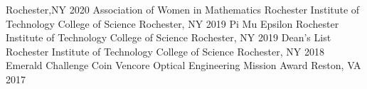 \begin{cvhonors}
 {Rochester,NY} {2020} 
  \cvhonor
    {Association of Women in Mathematics}
    {Rochester Institute of Technology College of Science}
    {Rochester, NY}
    {2019} 
  \cvhonor
    {Pi Mu Epsilon}
    {Rochester Institute of Technology College of Science}
    {Rochester, NY}
    {2019} 
  \cvhonor
    {Dean's List}
    {Rochester Institute of Technology College of Science}
    {Rochester, NY}
    {2018}  
   \cvhonor
    {Emerald Challenge Coin}
    {Vencore Optical Engineering Mission Award}
    {Reston, VA}
    {2017}
\end{cvhonors}